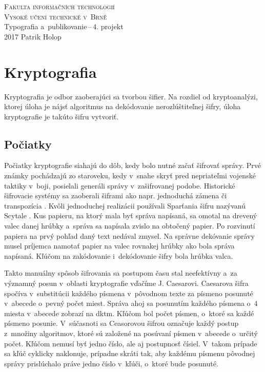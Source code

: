 \documentclass[11pt,a4paper]{article}
\begin{document}
\begin{titlepage}
\begin{center}
\Huge
\textsc{Fakulta informačních technologií\\
Vysoké učení technické v~Brně}
\\[84mm]
Typografia a~publikovanie\,--\,4. projekt\\
\vfill
{\LARGE 2017 \hfill Patrik Holop}
\end{center}
\end{titlepage}

\section{Kryptografia}
Kryptografia je odbor zaoberajúci sa tvorbou šifier. Na rozdiel od kryptoanalýzi, ktorej úloha je nájsť algoritmus na dekódovanie nerozlúštiteľnej šifry, úloha kryptografie je takúto šifru vytvoriť.
\subsection{Počiatky} 
Počiatky kryptografie siahajú do dôb, kedy bolo nutné začať šifrovať správy. Prvé známky pochádzajú zo staroveku, kedy v~snahe skryť pred nepriateľmi vojenské taktiky v~boji, posielali generáli správy v~zašifrovanej podobe. Historické šifrovacie systémy sa zaoberali šiframi ako napr. jednoduchá zámena či transpozícia \cite{SymKrypt}.
Kvôli jednoduchej realizácii používali Sparťania šifru nazývanú Scytale \cite{MatZInf}. Kus papieru, na ktorý mala byť správa napísaná, sa omotal na drevený valec danej hrúbky a~správa sa napísala zvislo na obtočený papier. Po rozvinutí papiera na prvý pohľad daný text nedával zmysel. Na správne dekóvanie správy musel príjemca namotať papier na valec rovnakej hrúbky ako bola správa napísaná. Kľúčom na zakódovanie i~dekódovanie šifry bola hrúbka valca.

Takto manuálny spôsob šifrovania sa postupom času stal neefektívny a~za významný posun v~oblasti kryptografie vďačíme J. Caesarovi. Caesarova šifra spočíva v~substitúcii každého písmena v~pôvodnom texte za písmeno posunuté v~abecede o~pevný počet miest. Správa ahoj sa posunutím každého písmena o~4 miesta v~abecede zobrazí na dktm. Kľúčom bol počet písmen, o~ktoré sa každé písmeno posunie.
V~súčasnoti sa Ceasorovou šifrou označuje každý postup z~množiny algoritmov, ktoré sú založené na posúvaní písmen v~abecede o~určitý počet. Kľúčom nemusí byť jedno číslo, ale aj postupnosť čísiel. V~takom prípade sa kľúč cyklicky naklonuje, prípadne skráti tak, aby každému písmenu pôvodnej správy prislúchalo práve jedno číslo v~kľúči, o~ktoré bude posunuté.  
\end{document}
